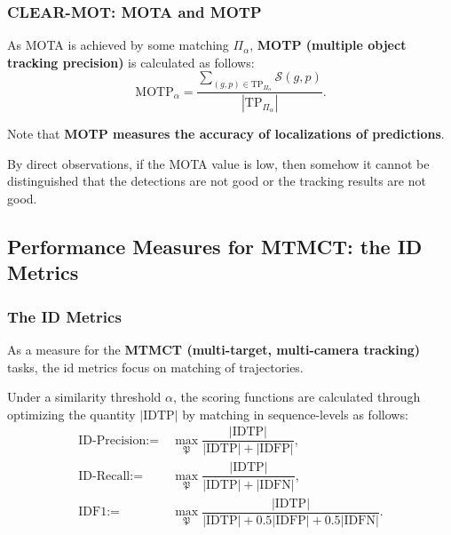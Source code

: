 \documentclass[slidetop, mathserif]{beamer}
\begin{document}
\begin{frame}
	\frametitle{CLEAR-MOT: MOTA and MOTP}
	
	As MOTA is achieved by some matching $\Pi_\alpha$, {\bf MOTP (multiple object tracking precision)}
	is calculated as follows:
	\[
		\text{MOTP}_\alpha =
		\dfrac{\sum_{(g,p)\in\text{TP}_{\Pi_\alpha}}\mathcal S(g,p)}{|\text{TP}_{\Pi_\alpha}|}.
	\]
	
	\quad 
	
	Note that {\bf\color{red} MOTP measures the accuracy of localizations of predictions}.
	
	By direct observations, if the MOTA value is low,
	then somehow it cannot be distinguished that
	the detections are not good or the tracking results are not good.
	
	
\end{frame}

\subsection{Performance Measures for MTMCT: the ID Metrics}

\begin{frame}
	\frametitle{The ID Metrics}
	
	As a measure for the {\bf MTMCT (multi-target, multi-camera tracking)} tasks,
	the id metrics focus on matching of trajectories.
	
	\quad 
	
	Under a similarity threshold $\alpha$, the scoring functions are calculated through optimizing
	the quantity $|\text{IDTP}|$ by matching in sequence-levels as follows:
	\begin{align*}
		\text{ID-Precision} := & ~ \max_{\mathfrak P} \dfrac{|\text{IDTP}|}{|\text{IDTP}| + |\text{IDFP}|}, \\
		\text{ID-Recall} :=    & ~ \max_{\mathfrak P}\dfrac{|\text{IDTP}|}{|\text{IDTP}| + |\text{IDFN}|},  \\
		\text{IDF1} :=         &                                                                            
		~ \max_{\mathfrak P}\dfrac{|\text{IDTP}|}{|\text{IDTP}| + 0.5|\text{IDFP}| + 0.5|\text{IDFN}|}.
	\end{align*}
	
\end{frame}
\end{document}
